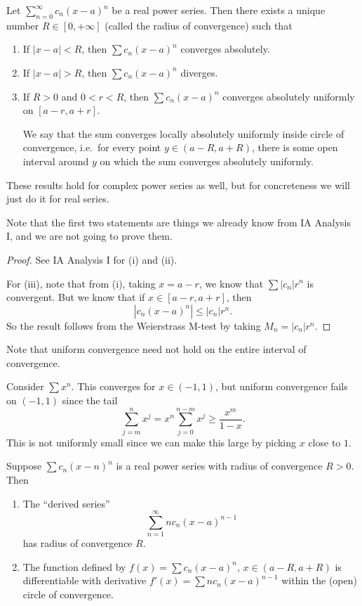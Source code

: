 \documentclass[a4paper]{article}
\begin{document}
\begin{thm}
  Let $\sum\limits_{n = 0}^\infty c_n (x - a)^n$ be a real power series. Then there exists a unique number $R\in [0, +\infty]$ (called the radius of convergence) such that
  \begin{enumerate}
    \item If $|x - a| < R$, then $\sum c_n (x - a)^n$ converges absolutely.
    \item If $|x - a| > R$, then $\sum c_n (x - a)^n$ diverges.
    \item If $R > 0$ and $0 < r < R$, then $\sum c_n (x - a)^n$ converges absolutely uniformly on $[a - r, a + r]$.

      We say that the sum converges locally absolutely uniformly inside circle of convergence, i.e.\ for every point $y\in (a - R, a + R)$, there is some open interval around $y$ on which the sum converges absolutely uniformly.
  \end{enumerate}
  These results hold for complex power series as well, but for concreteness we will just do it for real series.
\end{thm}
Note that the first two statements are things we already know from IA Analysis I, and we are not going to prove them.
\begin{proof}
  See IA Analysis I for (i) and (ii).

  For (iii), note that from (i), taking $x = a - r$, we know that $\sum |c_n| r^n$ is convergent. But we know that if $x\in [a - r, a + r]$, then
  \[
    |c_n (x - a)^n| \leq |c_n| r^n.
  \]
  So the result follows from the Weierstrass M-test by taking $M_n = |c_n| r^n$.
\end{proof}
Note that uniform convergence need not hold on the entire interval of convergence.
\begin{eg}
  Consider $\sum x^n$. This converges for $x\in (-1, 1)$, but uniform convergence fails on $(-1, 1)$ since the tail
  \[
    \sum_{j = m}^n x^j = x^n \sum_{j = 0}^{n - m} x^j \geq \frac{x^m}{1 - x}.
  \]
  This is not uniformly small since we can make this large by picking $x$ close to $1$.
\end{eg}

\begin{thm}
  Suppose $\sum c_n (x - n)^n$ is a real power series with radius of convergence $R > 0$. Then
  \begin{enumerate}
    \item The ``derived series''
      \[
        \sum_{n = 1}^\infty n c_n (x - a)^{n - 1}
      \]
      has radius of convergence $R$.
    \item The function defined by $f(x) = \sum c_n (x - a)^n$, $x\in (a - R, a + R)$ is differentiable with derivative $f'(x) = \sum n c_n (x - a)^{n - 1}$ within the (open) circle of convergence.
  \end{enumerate}
\end{thm}
\end{document}
